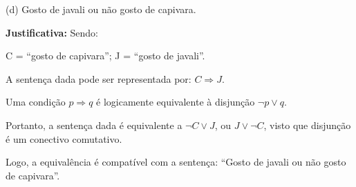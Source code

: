 \documentclass[12pt,letterpaper, onecolumn]{exam}
\begin{document}
\begin{questions}

    \begin{solution}
        (d) Gosto de javali ou não gosto de capivara.

        \textbf{Justificativa:} Sendo:
        
        C = “gosto de capivara”; \hfill
        J = “gosto de javali”.

        A sentença dada pode ser representada por: \( C \Rightarrow J\).
        
        Uma condição \( p \Rightarrow q \) é logicamente equivalente à disjunção \( \neg p \vee q \).

        Portanto, a sentença dada é equivalente a \( \neg C \vee J \), ou \( J \vee \neg C\), visto que disjunção é um conectivo comutativo.

        Logo, a equivalência é compatível com a sentença: “Gosto de javali ou não gosto de capivara”.
        \end{solution}
    
\end{questions}
\end{document}

